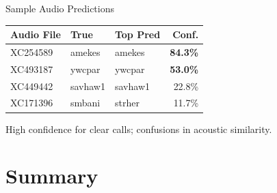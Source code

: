 \documentclass[aspectratio=169, 11pt]{beamer}
\begin{document}
\begin{frame}{Sample Audio Predictions}
    \begin{center}
        \scriptsize
        \begin{tabular}{lllr}
            \toprule
            \textbf{Audio File} & \textbf{True} & \textbf{Top Pred} & \textbf{Conf.} \\
            \midrule
            XC254589 & amekes & amekes & \textcolor{draculagreen}{\textbf{84.3\%}} \\
            XC493187 & ywcpar & ywcpar & \textcolor{draculagreen}{\textbf{53.0\%}} \\
            XC449442 & savhaw1 & savhaw1 & 22.8\% \\
            XC171396 & smbani & strher & \textcolor{draculared}{11.7\%} \\
            \bottomrule
        \end{tabular}
    \end{center}

    \begin{tcolorbox}[orangebox_tcb={Observation}]
        \scriptsize High confidence for clear calls; confusions in acoustic similarity.
    \end{tcolorbox}
\end{frame}

\section{Summary}
\end{document}
